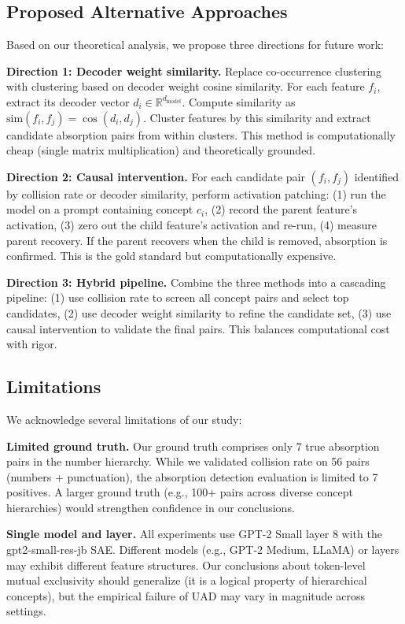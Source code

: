 \documentclass{article}
\begin{document}
\subsection{Proposed Alternative Approaches}

Based on our theoretical analysis, we propose three directions for future work:

\textbf{Direction 1: Decoder weight similarity.}
Replace co-occurrence clustering with clustering based on decoder weight cosine similarity. For each feature $f_i$, extract its decoder vector $d_i \in \mathbb{R}^{d_{\text{model}}}$. Compute similarity as $\text{sim}(f_i, f_j) = \cos(d_i, d_j)$. Cluster features by this similarity and extract candidate absorption pairs from within clusters. This method is computationally cheap (single matrix multiplication) and theoretically grounded.

\textbf{Direction 2: Causal intervention.}
For each candidate pair $(f_i, f_j)$ identified by collision rate or decoder similarity, perform activation patching: (1) run the model on a prompt containing concept $c_i$, (2) record the parent feature's activation, (3) zero out the child feature's activation and re-run, (4) measure parent recovery. If the parent recovers when the child is removed, absorption is confirmed. This is the gold standard but computationally expensive.

\textbf{Direction 3: Hybrid pipeline.}
Combine the three methods into a cascading pipeline: (1) use collision rate to screen all concept pairs and select top candidates, (2) use decoder weight similarity to refine the candidate set, (3) use causal intervention to validate the final pairs. This balances computational cost with rigor.

\subsection{Limitations}

We acknowledge several limitations of our study:

\textbf{Limited ground truth.} Our ground truth comprises only 7 true absorption pairs in the number hierarchy. While we validated collision rate on 56 pairs (numbers + punctuation), the absorption detection evaluation is limited to 7 positives. A larger ground truth (e.g., 100+ pairs across diverse concept hierarchies) would strengthen confidence in our conclusions.

\textbf{Single model and layer.} All experiments use GPT-2 Small layer 8 with the gpt2-small-res-jb SAE. Different models (e.g., GPT-2 Medium, LLaMA) or layers may exhibit different feature structures. Our conclusions about token-level mutual exclusivity should generalize (it is a logical property of hierarchical concepts), but the empirical failure of UAD may vary in magnitude across settings.
\end{document}
